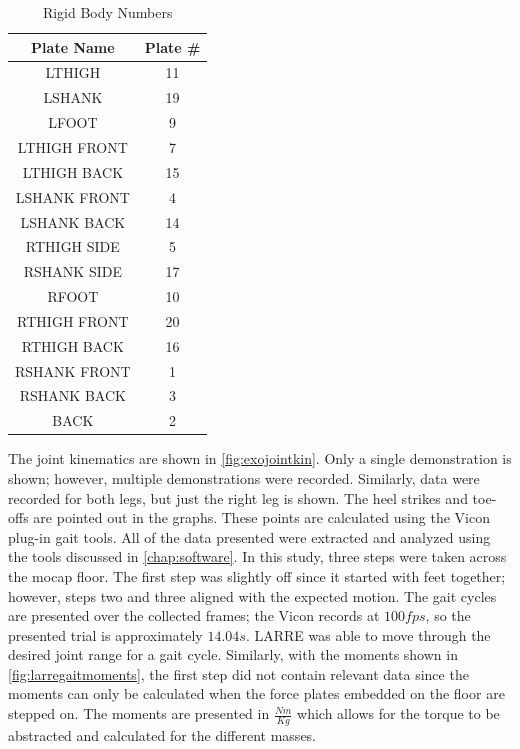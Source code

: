 \begin{table}[h!]
    \begin{centering}
            \begin{tabular}{||c  c ||} 
         \hline
            Plate Name & Plate \#  \\ [0.5ex] 
            \hline\hline
            LTHIGH	& 11 \\
            LSHANK &	19\\
            LFOOT &	9 \\
            LTHIGH FRONT &	7\\
            LTHIGH BACK &	15\\
            LSHANK FRONT &	4\\
            LSHANK BACK &	14\\
            RTHIGH SIDE &	5\\
            RSHANK SIDE &	17\\
            RFOOT &	10\\
            RTHIGH FRONT &	20\\
            RTHIGH BACK &	16\\
            RSHANK FRONT &	1\\
            RSHANK BACK &	3\\
            BACK &	2\\ [1ex] 
         \hline
        \end{tabular}
        \caption[Exoskeleton Rigid Body Numbers]{Rigid Body Numbers}
        \label{tab:exomarkerlayout}
    \end{centering}
\end{table}

The joint kinematics are shown in \autoref{fig:exojointkin}. Only a single demonstration is shown; however, multiple demonstrations were recorded. Similarly, data were recorded for both legs, but just the right leg is shown. The heel strikes and toe-offs are pointed out in the graphs. These points are calculated using the Vicon plug-in gait tools. All of the data presented were extracted and analyzed using the tools discussed in \autoref{chap:software}. In this study, three steps were taken across the mocap floor. The first step was slightly off since it started with feet together; however, steps two and three aligned with the expected motion. The gait cycles are presented over the collected frames; the Vicon records at $100fps$, so the presented trial is approximately $14.04s$. LARRE was able to move through the desired joint range for a gait cycle. Similarly, with the moments shown in \autoref{fig:larregaitmoments}, the first step did not contain relevant data since the moments can only be calculated when the force plates embedded on the floor are stepped on. The moments are presented in $\frac{Nm}{Kg}$ which allows for the torque to be abstracted and calculated for the different masses. 








